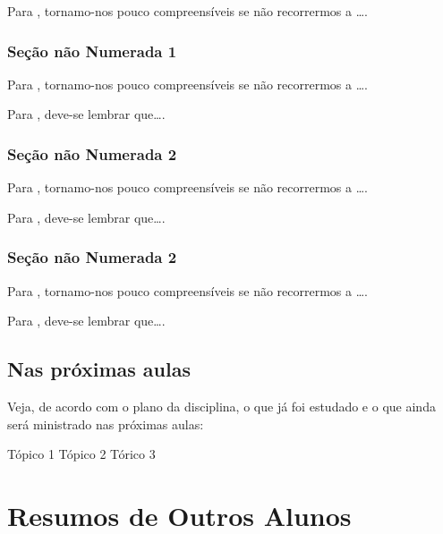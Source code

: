 \documentclass[
]{book}
\begin{document}
Para \citet{BOCK2001}, tornamo-nos pouco compreensíveis se não recorrermos a \ldots.

\hypertarget{seuxe7uxe3o-nuxe3o-numerada-1-37}{%
\subsection*{Seção não Numerada 1}\label{seuxe7uxe3o-nuxe3o-numerada-1-37}}

Para \citet{BOCK2001}, tornamo-nos pouco compreensíveis se não recorrermos a \ldots.

Para \citet{DAVIDOFF2001}, deve-se lembrar que\ldots.

\hypertarget{seuxe7uxe3o-nuxe3o-numerada-2-55}{%
\subsection*{Seção não Numerada 2}\label{seuxe7uxe3o-nuxe3o-numerada-2-55}}

Para \citet{BOCK2001}, tornamo-nos pouco compreensíveis se não recorrermos a \ldots.

Para \citet{DAVIDOFF2001}, deve-se lembrar que\ldots.

\hypertarget{seuxe7uxe3o-nuxe3o-numerada-2-56}{%
\subsection*{Seção não Numerada 2}\label{seuxe7uxe3o-nuxe3o-numerada-2-56}}

Para \citet{BOCK2001}, tornamo-nos pouco compreensíveis se não recorrermos a \ldots.

Para \citet{DAVIDOFF2001}, deve-se lembrar que\ldots.

\hypertarget{nas-pruxf3ximas-aulas-7}{%
\section{Nas próximas aulas}\label{nas-pruxf3ximas-aulas-7}}

Veja, de acordo com o plano da disciplina, o que já foi estudado e o que ainda será ministrado nas próximas aulas:

Tópico 1
Tópico 2
Tórico 3

\hypertarget{resumos-de-outros-alunos-1}{%
\chapter{Resumos de Outros Alunos}\label{resumos-de-outros-alunos-1}}
\end{document}
